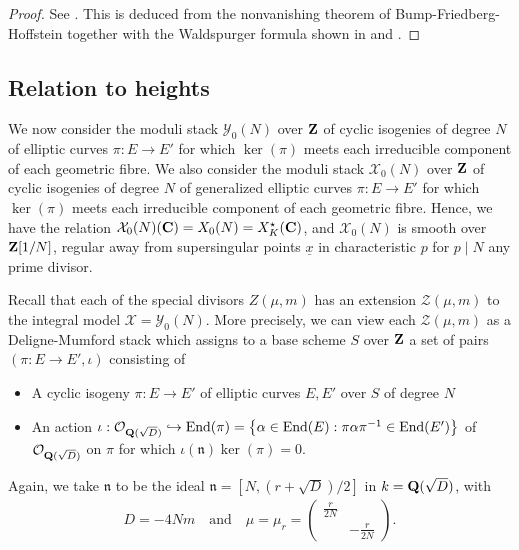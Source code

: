 \documentclass{amsart}
\theoremstyle{definition}
\theoremstyle{definition}
\theoremstyle{definition}
\begin{document}
\begin{proof} See \cite[Lemma 7.5]{BY}. This is deduced from the nonvanishing theorem of 
Bump-Friedberg-Hoffstein \cite{BFH} together with the Waldspurger formula  
shown in \cite[$\S$II.4 Corollary 1]{GKZ} and \cite{SZ}. \end{proof}

\subsection{Relation to heights}

We now consider the moduli stack $\mathcal{Y}_0(N)$ over ${\bf{Z}}$ of cyclic isogenies of degree $N$ of elliptic curves
$\pi: E \longrightarrow E'$ for which $\ker(\pi)$ meets each irreducible component of each geometric fibre. We also consider
the moduli stack $\mathcal{X}_0(N) $ over ${\bf{Z}}$ of cyclic isogenies of degree $N$ of generalized elliptic curves 
$\pi: E \longrightarrow E'$ for which $\ker(\pi)$ meets each irreducible component of each geometric fibre. 
Hence, we have the relation $\mathcal{X}_0(N)({\bf{C}}) = X_0(N) = X_K^{\star}({\bf{C}})$, and
$\mathcal{X}_0(N)$ is smooth over ${\bf{Z}}[1/N]$, regular away from supersingular points $\underline{x}$ in characteristic $p$ for $p \mid N$ any prime divisor. 

Recall that each of the special divisors $Z(\mu, m)$ has an extension $\mathcal{Z}(\mu, m)$ to the integral model $\mathcal{X} = \mathcal{Y}_0(N)$. 
More precisely, we can view each $\mathcal{Z}(\mu, m)$ as a Deligne-Mumford stack which assigns to a base scheme $S$ over ${\bf{Z}}$
a set of pairs $(\pi: E \longrightarrow E', \iota)$ consisting of 

\begin{itemize}

\item A cyclic isogeny $\pi: E \longrightarrow E'$ of elliptic curves $E, E'$ over $S$ of degree $N$ 

\item An action $\iota: \mathcal{O}_{ {\bf{Q}}(\sqrt{D}) } \hookrightarrow \operatorname{End}(\pi) = 
\left\lbrace \alpha \in \operatorname{End}(E): \pi \alpha \pi^{-1} \in \operatorname{End}(E') \right\rbrace$
of  $\mathcal{O}_{ {\bf{Q}}(\sqrt{D}) }$ on $\pi$ for which $\iota(\mathfrak{n}) \ker(\pi) = 0$. \end{itemize}

Again, we take $\mathfrak{n}$ to be the ideal $\mathfrak{n} = [N, (r + \sqrt{D})/2]$ in $k= {\bf{Q}}(\sqrt{D})$, with
\begin{align*} D = - 4 N m \quad \text{and} \quad \mu = \mu_r = \left( \begin{array}{cc} \frac{r}{2N} & ~~\\~~& - \frac{r}{2N}  \end{array} \right). \end{align*}
\end{document}
